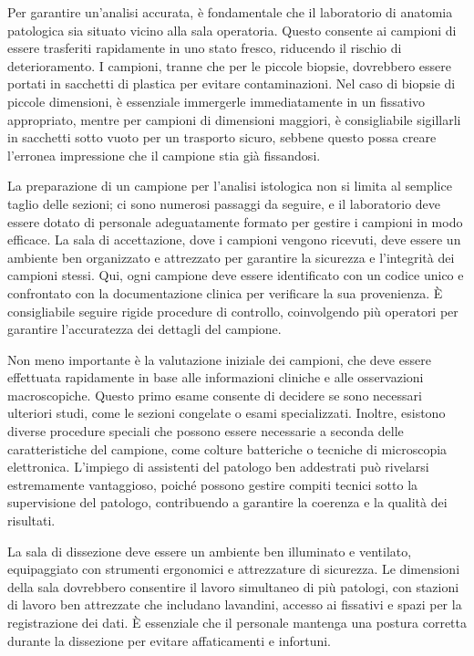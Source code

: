 Per garantire un’analisi accurata, è fondamentale che il laboratorio di anatomia patologica sia situato vicino alla sala operatoria. Questo consente ai campioni di essere trasferiti rapidamente in uno stato fresco, riducendo il rischio di deterioramento. I campioni, tranne che per le piccole biopsie, dovrebbero essere portati in sacchetti di plastica per evitare contaminazioni. Nel caso di biopsie di piccole dimensioni, è essenziale immergerle immediatamente in un fissativo appropriato, mentre per campioni di dimensioni maggiori, è consigliabile sigillarli in sacchetti sotto vuoto per un trasporto sicuro, sebbene questo possa creare l'erronea impressione che il campione stia già fissandosi.

La preparazione di un campione per l'analisi istologica non si limita al semplice taglio delle sezioni; ci sono numerosi passaggi da seguire, e il laboratorio deve essere dotato di personale adeguatamente formato per gestire i campioni in modo efficace. La sala di accettazione, dove i campioni vengono ricevuti, deve essere un ambiente ben organizzato e attrezzato per garantire la sicurezza e l’integrità dei campioni stessi. Qui, ogni campione deve essere identificato con un codice unico e confrontato con la documentazione clinica per verificare la sua provenienza. È consigliabile seguire rigide procedure di controllo, coinvolgendo più operatori per garantire l’accuratezza dei dettagli del campione.

Non meno importante è la valutazione iniziale dei campioni, che deve essere effettuata rapidamente in base alle informazioni cliniche e alle osservazioni macroscopiche. Questo primo esame consente di decidere se sono necessari ulteriori studi, come le sezioni congelate o esami specializzati. Inoltre, esistono diverse procedure speciali che possono essere necessarie a seconda delle caratteristiche del campione, come colture batteriche o tecniche di microscopia elettronica. L’impiego di assistenti del patologo ben addestrati può rivelarsi estremamente vantaggioso, poiché possono gestire compiti tecnici sotto la supervisione del patologo, contribuendo a garantire la coerenza e la qualità dei risultati.

La sala di dissezione deve essere un ambiente ben illuminato e ventilato, equipaggiato con strumenti ergonomici e attrezzature di sicurezza. Le dimensioni della sala dovrebbero consentire il lavoro simultaneo di più patologi, con stazioni di lavoro ben attrezzate che includano lavandini, accesso ai fissativi e spazi per la registrazione dei dati. È essenziale che il personale mantenga una postura corretta durante la dissezione per evitare affaticamenti e infortuni.

